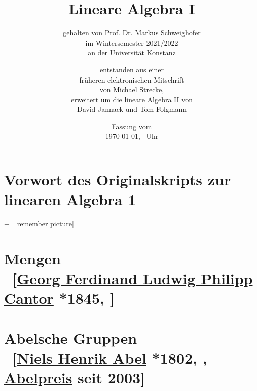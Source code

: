 \documentclass[
twoside=semi, %
fontsize=12,
DIV=12, %
cleardoublepage=current,
leqno,
headings=optiontoheadandtoc, %
toc=idx %
]{scrbook}
\theoremstyle{definition}
\DeclareMathOperator\im{im}
\begin{document}
\subject{Skript zur Vorlesung}
\title{Lineare Algebra I}
\subtitle{gehalten von \href{http://www.math.uni-konstanz.de/~schweigh/}{Prof. Dr. Markus Schweighofer}\\im Wintersemester 2021/2022\\an der Universität Konstanz}
\author{\small entstanden aus einer\\
\small früheren elektronischen Mitschrift\\
\small von \href{https://www.is.mpg.de/person/mstrecke}{Michael Strecke}, \\
\small erweitert um die lineare Algebra II von \\
\small David Jannack und Tom Folgmann}
\date{Fassung vom\\\today, \currenttime\ Uhr}
\frontmatter
\pagestyle{empty}

\maketitle

\noindent
    

\chapter*{Vorwort des Originalskripts zur linearen Algebra 1}
\pagestyle{scrheadings}
\manualmark
    

\tableofcontents

\mainmatter
{}+=[remember picture]

\chapter[tocentry={Mengen}]{Mengen \\ ~{\small[\href{http://de.wikipedia.org/wiki/Georg_Cantor}{Georg Ferdinand Ludwig Philipp Cantor} *1845, ]}}
    
    

\chapter[tocentry={Abelsche Gruppen}]{Abelsche Gruppen \\ ~{\small[\href{http://de.wikipedia.org/wiki/Niels_Henrik_Abel}{Niels Henrik Abel} *1802, , \href{http://de.wikipedia.org/wiki/Abelpreis}{Abelpreis} seit 2003]}}
    
\end{document}
